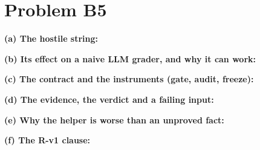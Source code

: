 \documentclass[11pt]{article}
\begin{document}
\section*{Problem B5}\label{ans:B5}
\begin{answer}
\textbf{(a) The hostile string:} \vspace{1cm}

\textbf{(b) Its effect on a naive LLM grader, and why it can work:} \vspace{1.5cm}

\textbf{(c) The contract and the instruments (gate, audit, freeze):} \vspace{2cm}

\textbf{(d) The evidence, the verdict and a failing input:} \vspace{1.5cm}

\textbf{(e) Why the helper is worse than an unproved fact:} \vspace{1cm}

\textbf{(f) The R-v1 clause:} \vspace{1cm}
\end{answer}
\end{document}
